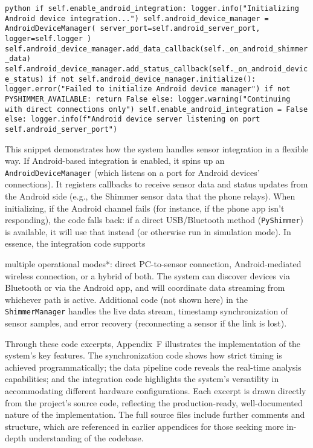 {{{{{\texttt{python if self.enable_android_integration: logger.info("Initializing Android device integration...") self.android_device_manager = AndroidDeviceManager( server_port=self.android_server_port, logger=self.logger ) self.android_device_manager.add_data_callback(self._on_android_shimmer_data) self.android_device_manager.add_status_callback(self._on_android_device_status) if not self.android_device_manager.initialize(): logger.error("Failed to initialize Android device manager") if not PYSHIMMER_AVAILABLE: return False else: logger.warning("Continuing with direct connections only") self.enable_android_integration = False else: logger.info(f"Android device server listening on port {self.android_server_port}")}\cite{ref57}

This snippet demonstrates how the system handles sensor integration in a
flexible way. If Android-based integration is enabled, it spins up an
\texttt{AndroidDeviceManager} (which listens on a port for Android devices'
connections). It registers callbacks to receive sensor data and status
updates from the Android side (e.g., the Shimmer sensor data that the
phone relays). When initializing, if the Android channel fails (for
instance, if the phone app isn't responding), the code falls back: if a
direct USB/Bluetooth method (\texttt{PyShimmer}) is available, it will use that
instead (or otherwise run in simulation
mode)\cite{ref56}.
In essence, the integration code supports }multiple operational modes*:
direct PC-to-sensor connection, Android-mediated wireless connection, or
a hybrid of
both\cite{ref58}.
The system can discover devices via Bluetooth or via the Android app,
and will coordinate data streaming from whichever path is
active\cite{ref59}\cite{ref60}.
Additional code (not shown here) in the \texttt{ShimmerManager} handles the
live data stream, timestamp synchronization of sensor samples, and error
recovery (reconnecting a sensor if the link is
lost)\cite{ref61}.

Through these code excerpts, Appendix F illustrates the implementation
of the system's key features. The synchronization code shows how strict
timing is achieved programmatically; the data pipeline code reveals the
real-time analysis capabilities; and the integration code highlights the
system's versatility in accommodating different hardware configurations.
Each excerpt is drawn directly from the project's source code,
reflecting the production-ready, well-documented nature of the
implementation. The full source files include further comments and
structure, which are referenced in earlier appendices for those seeking
more in-depth understanding of the codebase.

}}}}
